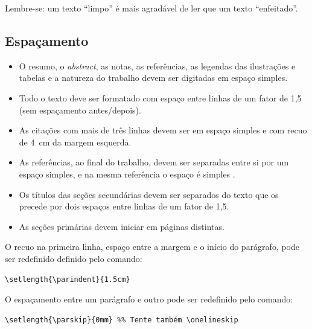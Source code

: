 \noindent Lembre-se: um texto ``limpo'' é mais agradável de ler que um texto ``enfeitado''.

\subsection{Espaçamento}\label{sec:espacamento}

\begin{itemize}%
\item O resumo, o \textit{abstract}, as notas, as referências, as legendas das ilustrações e tabelas e a natureza do trabalho devem ser digitadas em espaço simples.
\item Todo o texto deve ser formatado com espaço entre linhas de um fator de 1,5 (sem espaçamento antes/depois).
\item As citações com mais de três linhas devem ser em espaço simples e com recuo de \SI{4}{cm} da margem esquerda.
\item As referências, ao final do trabalho, devem ser separadas entre si por um espaço simples, e na mesma referência o espaço é simples \cite{NBR6023:2018}.
\item Os títulos das seções secundárias devem ser separados do texto que os precede por dois espaços entre linhas de um fator de 1,5.
\item As seções primárias devem iniciar em páginas distintas.
\end{itemize}

O recuo na primeira linha, espaço entre a margem e o início do parágrafo, pode ser redefinido definido pelo comando:

\begin{SingleSpacing}%
\begin{verbatim}
\setlength{\parindent}{1.5cm}
\end{verbatim}
\end{SingleSpacing}

O espaçamento entre um parágrafo e outro pode ser redefinido pelo comando:

\begin{SingleSpacing}%
\begin{verbatim}
\setlength{\parskip}{0mm} %% Tente também \onelineskip
\end{verbatim}
\end{SingleSpacing}

